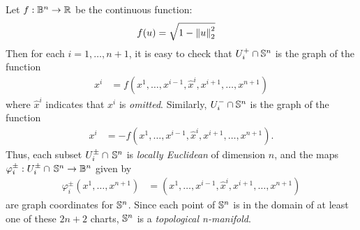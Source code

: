 \documentclass[11pt]{article}
\begin{document}
\begin{itemize}
\begin{example}
Let $f: \mathbb{B}^n \rightarrow {\mathbb R}$ be the continuous function:
\begin{align*}
f(u) &= \sqrt{1 - \left\|u\right\|_{2}^2}
\end{align*}
Then for each  $i = 1,\ldots,n+1$, it is easy to check that $U_{i}^{+} \cap {\mathbb S}^{n}$ is the graph of the function
\begin{align*}
x^{i} &= f(x^1, \ldots, x^{i-1}, \hat{x}^{i}, x^{i+1}, \ldots, x^{n+1})
\end{align*} where $\hat{x}^{i}$ indicates that $x^{i}$ is \emph{omitted}. Similarly, $U_{i}^{-} \cap {\mathbb S}^{n}$ is the graph of the function
\begin{align*}
x^{i} &= -f(x^1, \ldots, x^{i-1}, \hat{x}^{i}, x^{i+1}, \ldots, x^{n+1}).
\end{align*}
Thus, each subset $U_{i}^{\pm} \cap\, {\mathbb S}^{n}$ is \emph{locally Euclidean} of dimension $n$, and the maps $\varphi_{i}^{\pm}: U_{i}^{\pm} \cap \,{\mathbb S}^{n} \rightarrow \mathbb{B}^{n}$ given by
\begin{align*}
\varphi_{i}^{\pm}(x^1, \ldots, x^{n+1}) &= (x^1, \ldots, x^{i-1}, \hat{x}^{i}, x^{i+1}, \ldots, x^{n+1})
\end{align*} are graph coordinates for ${\mathbb S}^n$. Since each point of ${\mathbb S}^n$ is in the domain of at least one
of these $2n + 2$ charts, ${\mathbb S}^n$ is a \emph{topological n-manifold}.
\end{example}




\end{itemize}
\end{document}
